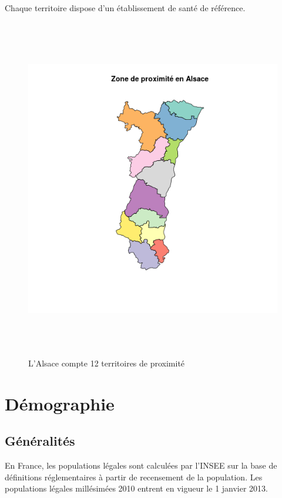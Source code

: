 \documentclass[12pt,english,french,twoside]{book}\usepackage[]{graphicx}\usepackage[]{color}
\begin{document}
Chaque territoire dispose d'un établissement de santé de référence.

\begin{figure}[ht]
 \centering
 \includegraphics[height=15cm,keepaspectratio=true]{../doc/cartographie/RPU2013_Carto_Pop/figure/zone_proximite.png}
 \caption{L’Alsace compte 12 territoires de proximité}
 \label{fig:zp}
\end{figure}

\section{Démographie}
\subsection{Généralités}

En France, les populations légales sont calculées par l'INSEE sur la base de définitions réglementaires à partir de recensement de la population. 
Les populations légales millésimées 2010 entrent en vigueur le 1\ier{} janvier 2013.  
\end{document}
